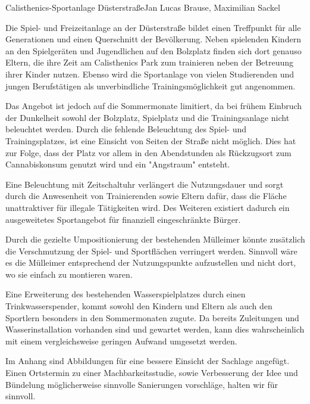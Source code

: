 \documentclass{../../templates/amendment}
\date{10. November 2020}
\begin{document}
\begin{boxed}{Calisthenics-Sportanlage Düsterstraße}{Jan Lucas Brause, Maximilian Sackel}

    Die Spiel- und Freizeitanlage an der Düsterstraße bildet einen Treffpunkt
    für alle Generationen und einen Querschnitt der Bevölkerung.
    Neben spielenden Kindern an den Spielgeräten und Jugendlichen auf den Bolzplatz
    finden sich dort genauso Eltern, die ihre Zeit am Calisthenics Park zum
    trainieren neben der Betreuung ihrer Kinder nutzen.
    Ebenso wird die Sportanlage von vielen Studierenden und jungen Berufstätigen als
    unverbindliche Trainingsmöglichkeit gut angenommen.

    Das Angebot ist jedoch auf die Sommermonate limitiert, da bei frühem Einbruch der
    Dunkelheit sowohl der Bolzplatz, Spielplatz und die Trainingsanlage nicht
    beleuchtet werden.
    Durch die fehlende Beleuchtung des Spiel- und Trainingsplatzes, ist eine Einsicht
    von Seiten der Straße nicht möglich.
    Dies hat zur Folge, dass der Platz vor allem in den Abendstunden als Rückzugsort
    zum Cannabiskonsum genutzt wird und ein "Angstraum" entsteht.

    Eine Beleuchtung mit Zeitschaltuhr verlängert die Nutzungsdauer und sorgt durch
    die Anwesenheit von Trainierenden sowie Eltern dafür, dass die Fläche unattraktiver für
    illegale Tätigkeiten wird.
    Des Weiteren existiert dadurch ein ausgeweitetes Sportangebot für finanziell
    eingeschränkte Bürger.

    Durch die gezielte Umpositionierung der bestehenden Mülleimer könnte zusätzlich die
    Verschmutzung der Spiel- und Sportflächen verringert werden.
    Sinnvoll wäre es die Mülleimer entsprechend der Nutzungspunkte aufzustellen
    und nicht dort, wo sie einfach zu montieren waren.

    Eine Erweiterung des bestehenden Wasserspielplatzes durch einen Trinkwasserspender,
    kommt sowohl den Kindern und Eltern als auch den Sportlern besonders in den
    Sommermonaten zugute.
    Da bereits Zuleitungen und Wasserinstallation vorhanden sind und gewartet
    werden, kann dies wahrscheinlich mit einem vergleichsweise geringen Aufwand
    umgesetzt werden.

    Im Anhang sind Abbildungen für eine bessere Einsicht der Sachlage
    angefügt.
    Einen Ortstermin zu einer Machbarkeitsstudie, sowie Verbesserung der Idee und
    Bündelung möglicherweise sinnvolle Sanierungen vorschläge, halten wir für sinnvoll.


\end{boxed}
\end{document}
